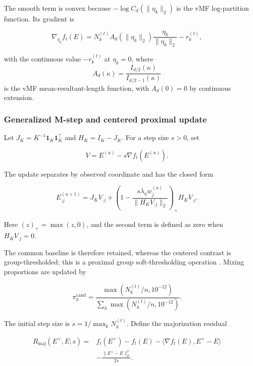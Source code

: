\documentclass[preprint,12pt,authoryear]{elsarticle}
\begin{document}
The smooth term is convex because
$-\log C_d(\lVert\eta_k\rVert_2)$ is the vMF log-partition function. Its
gradient is

\begin{equation}
\label{eq:fixed-responsibility-gradient}
\nabla_{\eta_k}f_t(E)
=N_k^{(t)}A_d(\lVert\eta_k\rVert_2)
\frac{\eta_k}{\lVert\eta_k\rVert_2}-r_k^{(t)},
\end{equation}

with the continuous value $-r_k^{(t)}$ at $\eta_k=0$, where
\[
A_d(\kappa)=\frac{I_{d/2}(\kappa)}{I_{d/2-1}(\kappa)}
\]
is the vMF mean-resultant-length function, with $A_d(0)=0$ by continuous
extension.

\subsubsection{Generalized M-step and centered proximal update}
\label{sec:centered-pg-update}

Let $J_K=K^{-1}\mathbf1_K\mathbf1_K^\top$ and $H_K=I_K-J_K$.
For a step size $s>0$, set

\begin{equation}
\label{eq:proximal-gradient-trial}
V=E^{(u)}-s\nabla f_t(E^{(u)}).
\end{equation}

The update separates by observed coordinate and has the closed form

\begin{equation}
\label{eq:centered-prox-update}
E_{\cdot j}^{(u+1)}
=J_KV_{\cdot j}
+\left(
1-\frac{s\lambda_\eta w_j^{(a)}}
{\lVert H_KV_{\cdot j}\rVert_2}
\right)_+H_KV_{\cdot j}.
\end{equation}

Here $(z)_+=\max(z,0)$, and the second term is defined as zero when
$H_KV_{\cdot j}=0$.

The common baseline is therefore retained, whereas the centered contrast is
group-thresholded; this is a proximal group soft-thresholding operation
\citep{parikh2014proximal}. Mixing proportions are updated by

\begin{equation}
\label{eq:mixing-update}
\pi_k^{\mathrm{cand}}
=\frac{\max(N_k^{(t)}/n,10^{-12})}
{\sum_h\max(N_h^{(t)}/n,10^{-12})}.
\end{equation}

The initial step size is $s=1/\max_kN_k^{(t)}$. Define the majorization
residual

\begin{equation}
\label{eq:majorization-residual}
\begin{aligned}
R_{\mathrm{maj}}(E^+,E;s)
={}&f_t(E^+)-f_t(E)
-\langle\nabla f_t(E),E^+-E\rangle\\
&-\frac{\lVert E^+-E\rVert_F^2}{2s}.
\end{aligned}
\end{equation}
\end{document}
